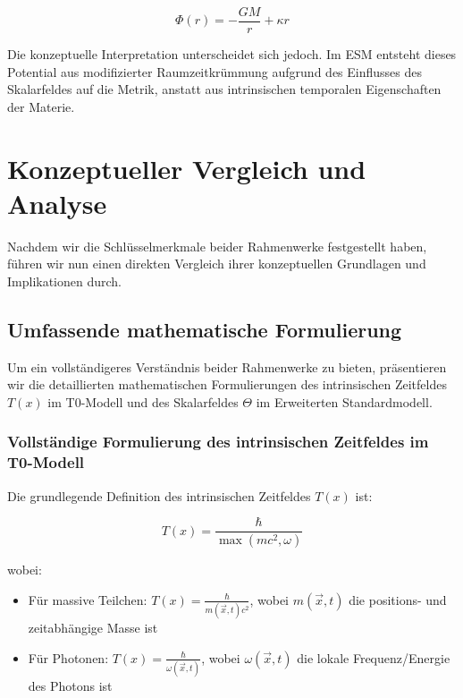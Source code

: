 \documentclass[12pt,a4paper]{article}
\newcommand{\Tfield}{T(x)}
\newcommand{\vecx}{\vec{x}}
\begin{document}
	\begin{equation}
		\Phi(r) = -\frac{GM}{r} + \kappa r
	\end{equation}
	
	Die konzeptuelle Interpretation unterscheidet sich jedoch. Im ESM entsteht dieses Potential aus modifizierter Raumzeitkrümmung aufgrund des Einflusses des Skalarfeldes auf die Metrik, anstatt aus intrinsischen temporalen Eigenschaften der Materie.
	
	\section{Konzeptueller Vergleich und Analyse}
	\label{sec:conceptual_comparison}
	
	Nachdem wir die Schlüsselmerkmale beider Rahmenwerke festgestellt haben, führen wir nun einen direkten Vergleich ihrer konzeptuellen Grundlagen und Implikationen durch.
	
	\subsection{Umfassende mathematische Formulierung}
	\label{subsec:comprehensive_math}
	
	Um ein vollständigeres Verständnis beider Rahmenwerke zu bieten, präsentieren wir die detaillierten mathematischen Formulierungen des intrinsischen Zeitfeldes \(\Tfield\) im T0-Modell und des Skalarfeldes \(\Theta\) im Erweiterten Standardmodell.
	
	\subsubsection{Vollständige Formulierung des intrinsischen Zeitfeldes im T0-Modell}
	\label{subsubsec:t0_complete}
	
	Die grundlegende Definition des intrinsischen Zeitfeldes \(\Tfield\) ist:
	
	\begin{equation}
		\Tfield = \frac{\hbar}{\max(mc^2, \omega)}
	\end{equation}
	
	wobei:
	\begin{itemize}
		\item Für massive Teilchen: \(\Tfield = \frac{\hbar}{m(\vecx,t)c^2}\), wobei \(m(\vecx,t)\) die positions- und zeitabhängige Masse ist
		\item Für Photonen: \(\Tfield = \frac{\hbar}{\omega(\vecx,t)}\), wobei \(\omega(\vecx,t)\) die lokale Frequenz/Energie des Photons ist
	\end{itemize}
	
\end{document}
